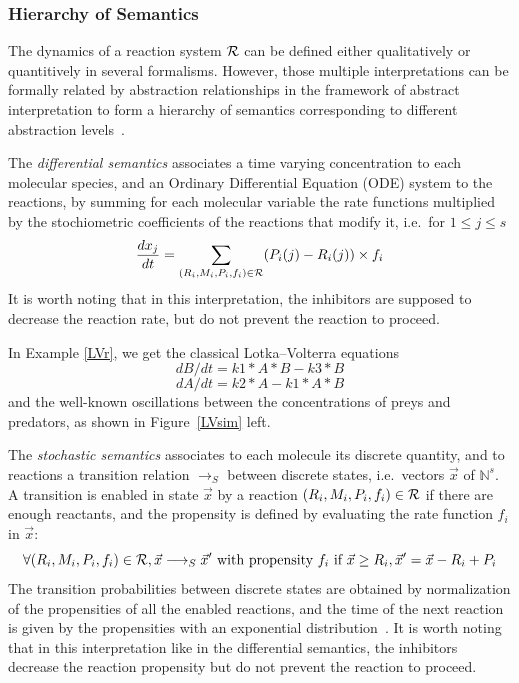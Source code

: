 \documentclass[graybox]{svmult}
\newcommand{\lra}{\longrightarrow}
\begin{document}
\subsubsection{Hierarchy of Semantics}\label{semR}

The dynamics of a reaction system $\cal R$ can be defined either qualitatively or quantitively in several formalisms.
However, those multiple interpretations can be formally related by abstraction relationships in the framework of abstract interpretation \cite{CC77popl}
to form a hierarchy of semantics corresponding to different abstraction levels~\cite{FS08tcs}.

The \emph{differential semantics} associates a time varying concentration to each molecular species,
and an Ordinary Differential Equation (ODE) system to the reactions,
by summing for each molecular variable the rate functions multiplied by the stochiometric coefficients of the reactions that modify it,
i.e.~for $1\le j\le s$
      \[\frac{dx_j}{dt} = \sum_{(R_i, M_i, P_i, f_i)\in\cal R}(P_i(j) - R_i(j))\times f_i\]
      It is worth noting that in this interpretation, the inhibitors are supposed to decrease the reaction rate, but do not prevent the reaction 
      to proceed.
      
      In Example \ref{LVr}, we get the classical Lotka--Volterra equations
      $$dB/dt = k1*A*B-k3*B$$
      $$dA/dt = k2*A-k1*A*B$$
and the well-known oscillations between the concentrations of preys and predators, as shown in Figure~\ref{LVsim} left.

The \emph{stochastic semantics} associates to each molecule its discrete quantity,
and to reactions a transition relation $\lra_S$ between discrete states, i.e.~vectors $\vec x$ of $\mathbb{N}^s$.
A transition is enabled in state $\vec x$ by a reaction $(R_i, M_i, P_i, f_i)\in\cal R$ if there are enough reactants,
and the propensity is defined by evaluating the rate function $f_i$ in  $\vec x$:
      $$\forall (R_i, M_i, P_i, f_i)\in{\cal R}, {\vec x}\lra_S{\vec x'} \text{ with propensity }f_i\text{ if } {\vec x}\geq R_i, {\vec x'} = {\vec x} - R_i + P_i$$
The transition probabilities between discrete states are obtained by
normalization of the propensities of all the enabled reactions,
and the time of the next reaction is given
by the propensities with an exponential distribution~\cite{Gillespie77jpc}.
      It is worth noting that in this interpretation like in the differential semantics, 
the inhibitors decrease the reaction propensity but do not prevent the reaction to proceed.
\end{document}

